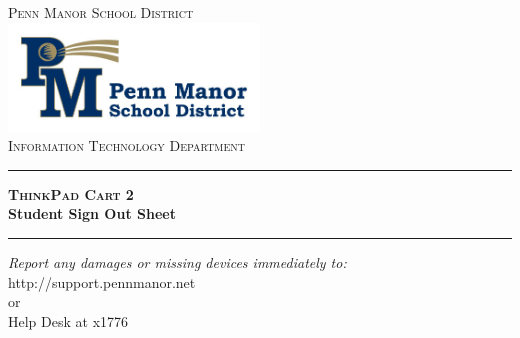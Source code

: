 \begin{titlepage}

\begin{center}

\textsc{\LARGE Penn Manor School District}\\[1.5cm]


\includegraphics[width=0.5\textwidth]{images/logo}\\[1cm]


\textsc{\Large Information Technology Department}\\[0.5cm]


\hrule
{\huge \bfseries \textsc{ThinkPad Cart} 2\\ \vspace{0.5cm} Student Sign Out Sheet}\\[0.4cm]

\hrule


\vfill
\begin{center} \large
\emph{Report any damages or missing devices immediately to:}\\
http://support.pennmanor.net \\or\\Help Desk at x1776
\end{center}


\vfill

\end{center}

\end{titlepage}
